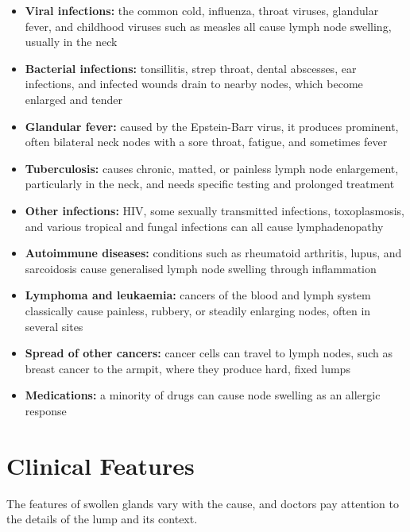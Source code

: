 \begin{itemize}
    \item \textbf{Viral infections:} the common cold, influenza, throat viruses, glandular fever, and childhood viruses such as measles all cause lymph node swelling, usually in the neck
    \item \textbf{Bacterial infections:} tonsillitis, strep throat, dental abscesses, ear infections, and infected wounds drain to nearby nodes, which become enlarged and tender
    \item \textbf{Glandular fever:} caused by the Epstein-Barr virus, it produces prominent, often bilateral neck nodes with a sore throat, fatigue, and sometimes fever
    \item \textbf{Tuberculosis:} causes chronic, matted, or painless lymph node enlargement, particularly in the neck, and needs specific testing and prolonged treatment
    \item \textbf{Other infections:} HIV, some sexually transmitted infections, toxoplasmosis, and various tropical and fungal infections can all cause lymphadenopathy
    \item \textbf{Autoimmune diseases:} conditions such as rheumatoid arthritis, lupus, and sarcoidosis cause generalised lymph node swelling through inflammation
    \item \textbf{Lymphoma and leukaemia:} cancers of the blood and lymph system classically cause painless, rubbery, or steadily enlarging nodes, often in several sites
    \item \textbf{Spread of other cancers:} cancer cells can travel to lymph nodes, such as breast cancer to the armpit, where they produce hard, fixed lumps
    \item \textbf{Medications:} a minority of drugs can cause node swelling as an allergic response
\end{itemize}

\section*{Clinical Features}
The features of swollen glands vary with the cause, and doctors pay attention to the details of the lump and its context.

